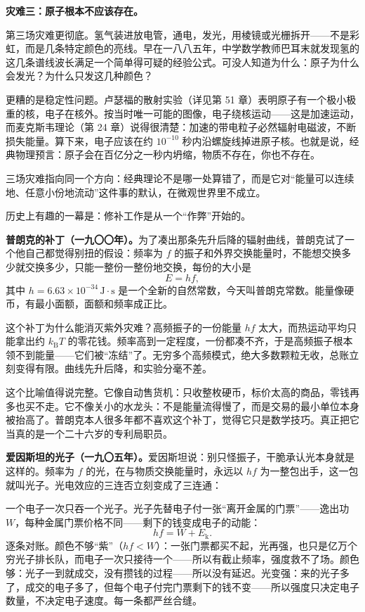 \textbf{灾难三：原子根本不应该存在。}

第三场灾难更彻底。氢气装进放电管，通电，发光，用棱镜或光栅拆开——不是彩虹，而是几条特定颜色的亮线。早在一八八五年，中学数学教师巴耳末就发现氢的这几条谱线波长满足一个简单得可疑的经验公式。可没人知道为什么：原子为什么会发光？为什么只发这几种颜色？

更糟的是稳定性问题。卢瑟福的散射实验（详见第 51 章）表明原子有一个极小极重的核，电子在核外。按当时唯一可能的图像，电子绕核运动——这是加速运动，而麦克斯韦理论（第 24 章）说得很清楚：加速的带电粒子必然辐射电磁波，不断损失能量。算下来，电子应该在约 \(10^{-10}\) 秒内沿螺旋线掉进原子核。也就是说，经典物理预言：原子会在百亿分之一秒内坍缩，物质不存在，你也不存在。

三场灾难指向同一个方向：经典理论不是哪一处算错了，而是它对“能量可以连续地、任意小份地流动”这件事的默认，在微观世界里不成立。


历史上有趣的一幕是：修补工作是从一个“作弊”开始的。

\textbf{普朗克的补丁（一九〇〇年）。}为了凑出那条先升后降的辐射曲线，普朗克试了一个他自己都觉得别扭的假设：频率为 \(f\) 的振子和外界交换能量时，不能想交换多少就交换多少，只能一整份一整份地交换，每份的大小是
\[
E = hf,
\]
其中 \(h = 6.63\times 10^{-34}\,\mathrm{J\cdot s}\) 是一个全新的自然常数，今天叫普朗克常数。能量像硬币，有最小面额，面额和频率成正比。

这个补丁为什么能消灭紫外灾难？高频振子的一份能量 \(hf\) 太大，而热运动平均只能拿出约 \(k_{\mathrm{B}}T\) 的零花钱。频率高到一定程度，一份都凑不齐，于是高频振子根本领不到能量——它们被“冻结”了。无穷多个高频模式，绝大多数颗粒无收，总账立刻变得有限。曲线先升后降，和实验分毫不差。

这个比喻值得说完整。它像自动售货机：只收整枚硬币，标价太高的商品，零钱再多也买不走。它不像关小的水龙头：不是能量流得慢了，而是交易的最小单位本身被抬高了。普朗克本人很多年都不喜欢这个补丁，觉得它只是数学技巧。真正把它当真的是一个二十六岁的专利局职员。

\textbf{爱因斯坦的光子（一九〇五年）。}爱因斯坦说：别只怪振子，干脆承认光本身就是这样的。频率为 \(f\) 的光，在与物质交换能量时，永远以 \(hf\) 为一整包出手，这一包就叫光子。光电效应的三连否立刻变成了三连通：

一个电子一次只吞一个光子。光子先替电子付一张“离开金属的门票”——逸出功 \(W\)，每种金属门票价格不同——剩下的钱变成电子的动能：
\[
hf = W + E_{\mathrm{k}}.
\]
逐条对账。颜色不够“紫”（\(hf < W\)）：一张门票都买不起，光再强，也只是亿万个穷光子排长队，而电子一次只接待一个——所以有截止频率，强度救不了场。颜色够：光子一到就成交，没有攒钱的过程——所以没有延迟。光变强：来的光子多了，成交的电子多了，但每个电子付完门票剩下的钱不变——所以强度只决定电子数量，不决定电子速度。每一条都严丝合缝。

